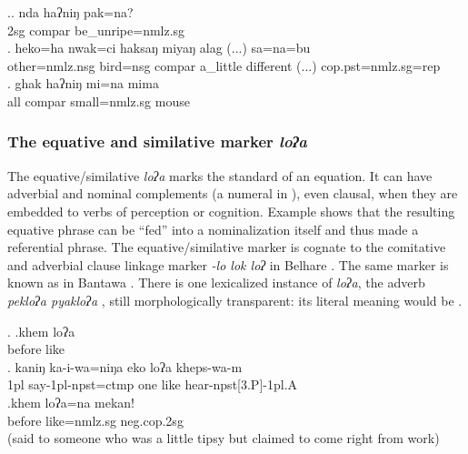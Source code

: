   
\ex.\ag. nda haʔniŋ pak=na?\\
		2sg  {\sc compar}	be\_unripe{\sc =nmlz.sg}\\
\bg. heko=ha nwak=ci haksaŋ miyaŋ alag (...) sa=na=bu\\
	other{\sc =nmlz.nsg} bird{\sc =nsg} {\sc compar}  a\_little different (...) {\sc cop.pst=nmlz.sg=rep}\\
	 
\bg. ghak haʔniŋ mi=na  mima\\
	all {\sc compar} small{\sc =nmlz.sg} mouse\\
 
  

\subsubsection{The equative and similative marker \emph{loʔa}}
  
  The equative/similative \emph{loʔa} marks the standard of an equation. It can have adverbial \Next[a] and nominal  complements  (a numeral in \Next[b]), even clausal, when they are embedded to verbs of perception or cognition. Example \Next[c] shows that the resulting equative phrase  can be “fed”  into a nominalization itself and thus made a referential phrase. The equative/similative marker is cognate to the comitative and adverbial clause linkage marker \emph{-lo \ti lok \ti loʔ} in Belhare  \citep{Bickel1993Belhare}. The same marker is known as  in Bantawa  \citep{Doornenbal2009A-grammar}.  There is one lexicalized instance of  \emph{loʔa}, the adverb  \emph{pekloʔa \ti pyakloʔa} , still morphologically transparent: its literal meaning would be .
 
 
  \ex. \ag.khem loʔa\\
 before like\\
 \bg. kaniŋ ka-i-wa=niŋa eko loʔa kheps-wa-m\\
 {\sc 1pl} say{\sc -1pl-npst=ctmp} one like hear{\sc -npst[3.P]-1pl.A}\\
  
  \bg.khem loʔa=na mekan!\\
  before like{\sc =nmlz.sg} {\sc neg.cop.2sg}\\
   (said to someone who was a little tipsy but claimed to come right from work)
  
